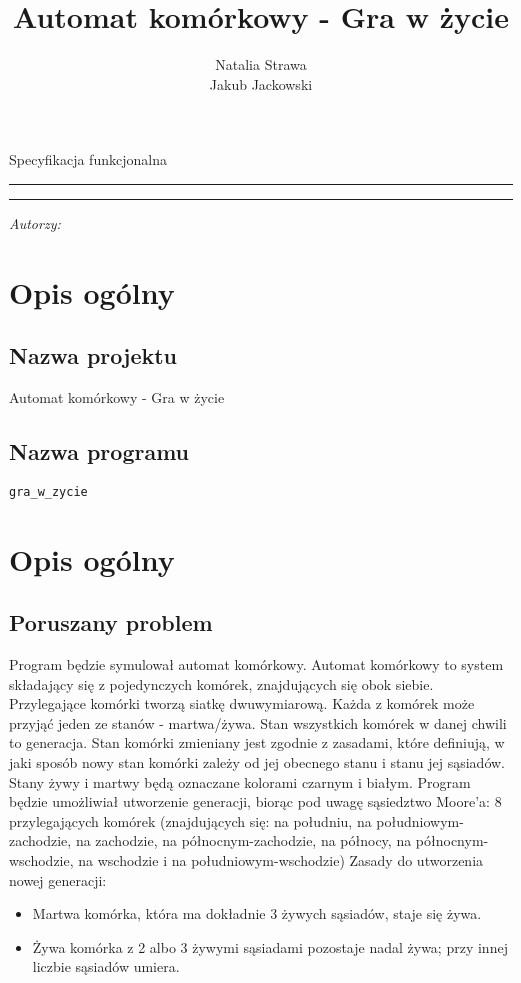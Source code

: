 \documentclass[12pt,a4paper,notitlepage]{report}
\author{Natalia Strawa\\
		Jakub Jackowski}
\title{Automat komórkowy - Gra w życie}
\makeatletter
\newcommand{\linia}{\rule{\linewidth}{0.4mm}}
\renewcommand{\maketitle}{\begin{titlepage}

\thispagestyle{fancy}

    \vspace*{1cm}

    \begin{center}
    
    \Large

    Specyfikacja funkcjonalna
    
    \end{center}

    \vspace{3cm}

    \noindent\linia

    \begin{center}

      \LARGE \textsc{\@title}

         \end{center}

     \noindent\linia

    \vspace{0.5cm}

    \begin{flushright}

    \begin{minipage}{5cm}

    \textit{\small Autorzy:}\\

    \normalsize \textsc{\@author} \par

    \end{minipage}


     \end{flushright}

    \vspace*{\stretch{6}}


  \end{titlepage}%

}
\makeatother
\begin{document}
\maketitle
\newpage
\tableofcontents
\setcounter{page}{2}
\thispagestyle{fancy}
\newpage

\section{Opis ogólny}
\subsection{Nazwa projektu}

Automat komórkowy - Gra w życie
\subsection{Nazwa programu}

\begin{verbatim}
gra_w_zycie
\end{verbatim}
\section{Opis ogólny}


\subsection{Poruszany problem}

Program będzie symulował automat komórkowy. Automat komórkowy to system składający się z pojedynczych komórek, znajdujących się obok siebie. Przylegające komórki tworzą siatkę dwuwymiarową. Każda z komórek może przyjąć jeden ze stanów - martwa/żywa. Stan wszystkich komórek w danej chwili to generacja.  Stan komórki zmieniany jest zgodnie z zasadami, które definiują, w jaki sposób nowy stan komórki zależy od jej obecnego stanu i stanu jej sąsiadów. Stany żywy i martwy będą oznaczane kolorami czarnym i białym. Program będzie umożliwiał utworzenie generacji, biorąc pod uwagę sąsiedztwo Moore'a: 
8 przylegających komórek (znajdujących się: na południu, na południowym-zachodzie, na zachodzie, na północnym-zachodzie, na północy, na północnym-wschodzie, na wschodzie i na południowym-wschodzie)
Zasady do utworzenia nowej generacji:
\begin{itemize}
	\item Martwa komórka, która ma dokładnie 3 żywych sąsiadów, staje się żywa.
	\item Żywa komórka z 2 albo 3 żywymi sąsiadami pozostaje nadal żywa; przy innej liczbie sąsiadów umiera.
	
\end{itemize}
\end{document}
